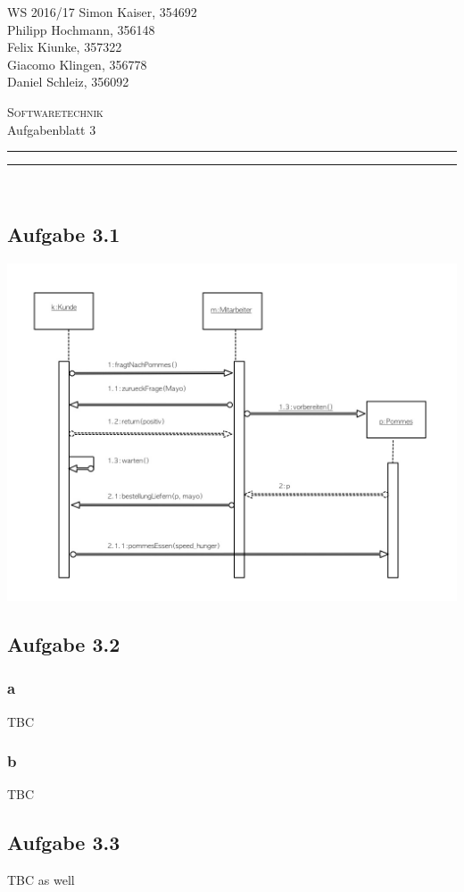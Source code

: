 \documentclass[a4paper,graphics,11pt]{article}
\newcommand\aufgabe[1]{\subsection*{Aufgabe #1}}
\newcommand\aufgabenteil[1]{\subsubsection*{#1}}
\begin{document}
\noindent WS 2016/17        \hfill Simon Kaiser, 354692 \\
\null                                     \hfill Philipp Hochmann, 356148 \\
\null                                     \hfill Felix Kiunke, 357322 \\
\null                                     \hfill Giacomo Klingen, 356778 \\
\null                                     \hfill Daniel Schleiz, 356092 \\

\begin{center}
\Large \textsc{Softwaretechnik} \\   %
\large Aufgabenblatt 3                        %
\end{center}
\begin{center}
\rule[0.5ex]{\textwidth}{0.6pt}\vspace*{-\baselineskip}\vspace{3.2pt}
\rule[0.5ex]{\textwidth}{1.6pt}\\
\end{center}

%
% 

\aufgabe{3.1}

\includegraphics[width=1\textwidth]{SWT31}

\aufgabe{3.2}
\aufgabenteil{a}
TBC
\aufgabenteil{b}
TBC
\aufgabe{3.3}
TBC as well
\end{document}
